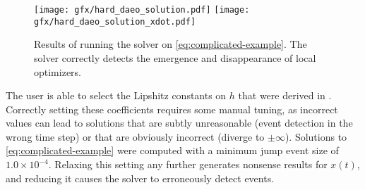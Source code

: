 \documentclass[twoside,leqno, twocolumn]{article}
\begin{document}
\begin{figure}[h]
	\centering
	\texttt{[image: gfx/hard\_daeo\_solution.pdf]}
	\texttt{[image: gfx/hard\_daeo\_solution\_xdot.pdf]}
	
	\caption{Results of running the solver on \eqref{eq:complicated-example}. The solver correctly detects the emergence and disappearance of local optimizers.}
	\label{fig:complicated-example-solution}
\end{figure}

The user is able to select the Lipshitz constants on $h$ that were derived in \cite{deussenNumericalSimulationDifferentialalgebraic2023}. Correctly setting these coefficients requires some manual tuning, as incorrect values can lead to solutions that are subtly unreasonable (event detection in the wrong time step) or that are obviously incorrect (diverge to $\pm\infty$). Solutions to \eqref{eq:complicated-example} were computed with a minimum jump event size of $1.0\times10^{-4}$. Relaxing this setting any further generates nonsense results for $x(t)$, and reducing it causes the solver to erroneously detect events.

%
%
\end{document}
